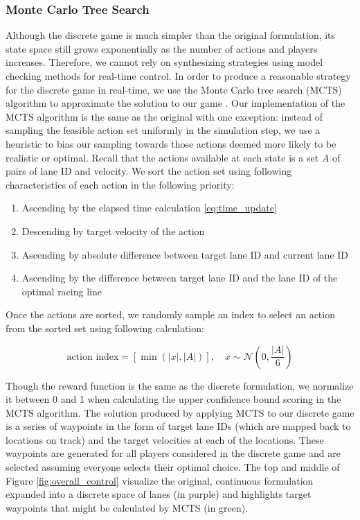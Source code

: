 \subsubsection{Monte Carlo Tree Search}
Although the discrete game is much simpler than the original formulation, its state space still grows exponentially as the number of actions and players increases. Therefore, we cannot rely on synthesizing strategies using model checking methods for real-time control. In order to produce a reasonable strategy for the discrete game in real-time, we use the Monte Carlo tree search (MCTS) algorithm to approximate the solution to our game \cite{mcts}. Our implementation of the MCTS algorithm is the same as the original with one exception: instead of sampling the feasible action set uniformly in the simulation step, we use a heuristic to bias our sampling towards those actions deemed more likely to be realistic or optimal. Recall that the actions available at each state is a set $A$ of pairs of lane ID and velocity. We sort the action set using following characteristics of each action in the following priority:
\begin{enumerate}
    \item Ascending by the elapsed time calculation \eqref{eq:time_update}
    \item Descending by target velocity of the action
    \item Ascending by absolute difference between target lane ID and current lane ID
    \item Ascending by the difference between target lane ID and the lane ID of the optimal racing line
\end{enumerate}
Once the actions are sorted, we randomly sample an index to select an action from the sorted set using following calculation:

\begin{equation}
    \text{action index} = [\min(|x|, |A|)], \quad
     x \sim \mathcal{N}(0, \frac{|A|}{6})
\end{equation}

Though the reward function is the same as the discrete formulation, we normalize it between 0 and 1 when calculating the upper confidence bound scoring in the MCTS algorithm. The solution produced by applying MCTS to our discrete game is a series of waypoints in the form of target lane IDs (which are mapped back to locations on track) and the target velocities at each of the locations. These waypoints are generated for all players considered in the discrete game and are selected assuming everyone selects their optimal choice. The top and middle of Figure \ref{fig:overall_control} visualize the original, continuous formulation expanded into a discrete space of lanes (in purple) and highlights target waypoints that might be calculated by MCTS (in green).  

